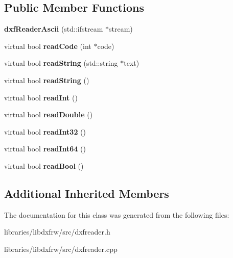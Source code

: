\subsection*{Public Member Functions}
\begin{DoxyCompactItemize}
\item 
\hypertarget{classdxfReaderAscii_ab885a9844558de58c7f9f1e9083be77a}{{\bfseries dxf\-Reader\-Ascii} (std\-::ifstream $\ast$stream)}\label{classdxfReaderAscii_ab885a9844558de58c7f9f1e9083be77a}

\item 
\hypertarget{classdxfReaderAscii_ae9da183d42ff6a53d4b9b121888d90cf}{virtual bool {\bfseries read\-Code} (int $\ast$code)}\label{classdxfReaderAscii_ae9da183d42ff6a53d4b9b121888d90cf}

\item 
\hypertarget{classdxfReaderAscii_a745e4a9166d36f24e1bf0e4b6f495849}{virtual bool {\bfseries read\-String} (std\-::string $\ast$text)}\label{classdxfReaderAscii_a745e4a9166d36f24e1bf0e4b6f495849}

\item 
\hypertarget{classdxfReaderAscii_a0c906bfcc992bdffab35659bec0907f9}{virtual bool {\bfseries read\-String} ()}\label{classdxfReaderAscii_a0c906bfcc992bdffab35659bec0907f9}

\item 
\hypertarget{classdxfReaderAscii_a12068cdfb93e7af024ce586ce4947c62}{virtual bool {\bfseries read\-Int} ()}\label{classdxfReaderAscii_a12068cdfb93e7af024ce586ce4947c62}

\item 
\hypertarget{classdxfReaderAscii_a2f00bd85c4cd394680cef2777a1aba6b}{virtual bool {\bfseries read\-Double} ()}\label{classdxfReaderAscii_a2f00bd85c4cd394680cef2777a1aba6b}

\item 
\hypertarget{classdxfReaderAscii_a0048571bbe199b6f6c37acb2c70f5bea}{virtual bool {\bfseries read\-Int32} ()}\label{classdxfReaderAscii_a0048571bbe199b6f6c37acb2c70f5bea}

\item 
\hypertarget{classdxfReaderAscii_ab9c17a6dafa6069a75648aa19630c2a7}{virtual bool {\bfseries read\-Int64} ()}\label{classdxfReaderAscii_ab9c17a6dafa6069a75648aa19630c2a7}

\item 
\hypertarget{classdxfReaderAscii_a6d98a64d1cbd6a592eb6d632a102bdf3}{virtual bool {\bfseries read\-Bool} ()}\label{classdxfReaderAscii_a6d98a64d1cbd6a592eb6d632a102bdf3}

\end{DoxyCompactItemize}
\subsection*{Additional Inherited Members}


The documentation for this class was generated from the following files\-:\begin{DoxyCompactItemize}
\item 
libraries/libdxfrw/src/dxfreader.\-h\item 
libraries/libdxfrw/src/dxfreader.\-cpp\end{DoxyCompactItemize}
